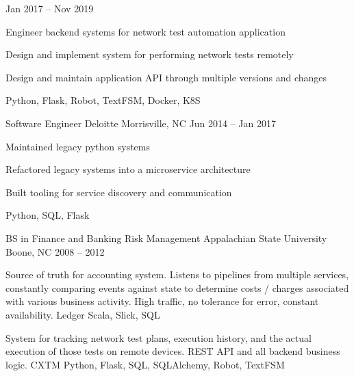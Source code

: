 \documentclass[]{awesome-cv}
\begin{document}
\begin{cventries}
	{Jan 2017 – Nov 2019}
	{\begin{cvitems}
		\item {Engineer backend systems for network test automation application}
		\item {Design and implement system for performing network tests remotely}
		\item {Design and maintain application API through multiple versions and changes}
		\item {Python, Flask, Robot, TextFSM, Docker, K8S}
		\end{cvitems}}
	\cventry
	{Software Engineer}
	{Deloitte}
	{Morrisville, NC}
	{Jun 2014 – Jan 2017}
	{\begin{cvitems}
		\item {Maintained legacy python systems}
		\item {Refactored legacy systems into a microservice architecture}
		\item {Built tooling for service discovery and communication}
		\item {Python, SQL, Flask}
		\end{cvitems}}
\end{cventries}
\begin{cventries}
	\cventry
	{BS in Finance and Banking \textbar{} Risk Management}
	{Appalachian State University}
	{Boone, NC}
	{2008 – 2012}
	{}
\end{cventries}

\vspace{-2mm}

\begin{cventries}
	\cventry
	{Source of truth for accounting system. Listens to pipelines from multiple services, constantly comparing events against state to determine costs / charges associated with various business activity. High traffic, no tolerance for error, constant availability.}
	{Ledger}
	{Scala, Slick, SQL}
	{}
	{}
	
	\vspace{-5mm}
	\cventry
	{System for tracking network test plans, execution history, and the actual execution of those tests on remote devices. REST API and all backend business logic.}
	{CXTM}
	{Python, Flask, SQL, SQLAlchemy, Robot, TextFSM}
	{}
	{}
	
	\vspace{-5mm}
\end{cventries}

\ 
\end{document}
